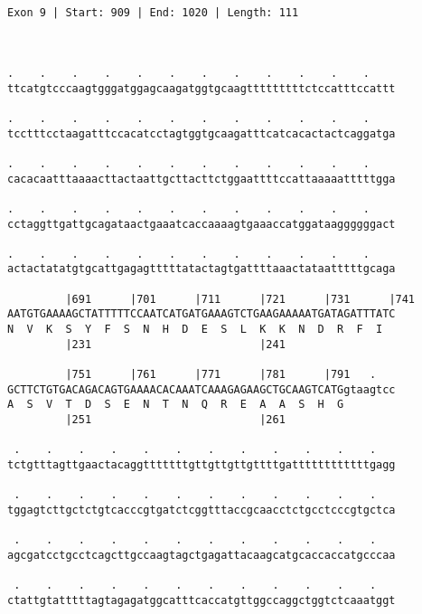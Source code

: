 \documentclass{article}
\begin{document}
\begin{Verbatim}
                                                  
 
Exon 9 | Start: 909 | End: 1020 | Length: 111



.    .    .    .    .    .    .    .    .    .    .    .    
ttcatgtcccaagtgggatggagcaagatggtgcaagtttttttttctccatttccattt
                                                            
.    .    .    .    .    .    .    .    .    .    .    .    
tcctttcctaagatttccacatcctagtggtgcaagatttcatcacactactcaggatga
                                                            
.    .    .    .    .    .    .    .    .    .    .    .    
cacacaatttaaaacttactaattgcttacttctggaattttccattaaaaatttttgga
                                                            
.    .    .    .    .    .    .    .    .    .    .    .    
cctaggttgattgcagataactgaaatcaccaaaagtgaaaccatggataaggggggact
                                                            
.    .    .    .    .    .    .    .    .    .    .    .    
actactatatgtgcattgagagtttttatactagtgattttaaactataatttttgcaga
                                                            
         |691      |701      |711      |721      |731      |741
AATGTGAAAAGCTATTTTTCCAATCATGATGAAAGTCTGAAGAAAAATGATAGATTTATC
N  V  K  S  Y  F  S  N  H  D  E  S  L  K  K  N  D  R  F  I  
         |231                          |241                 
  
         |751      |761      |771      |781      |791   .   
GCTTCTGTGACAGACAGTGAAAACACAAATCAAAGAGAAGCTGCAAGTCATGgtaagtcc
A  S  V  T  D  S  E  N  T  N  Q  R  E  A  A  S  H  G        
         |251                          |261                 
  
 .    .    .    .    .    .    .    .    .    .    .    .   
tctgtttagttgaactacaggtttttttgttgttgttgttttgattttttttttttgagg
                                                            
 .    .    .    .    .    .    .    .    .    .    .    .   
tggagtcttgctctgtcacccgtgatctcggtttaccgcaacctctgcctcccgtgctca
                                                            
 .    .    .    .    .    .    .    .    .    .    .    .   
agcgatcctgcctcagcttgccaagtagctgagattacaagcatgcaccaccatgcccaa
                                                            
 .    .    .    .    .    .    .    .    .    .    .    .   
ctattgtatttttagtagagatggcatttcaccatgttggccaggctggtctcaaatggt
                                                            

\end{Verbatim}
\end{document}
